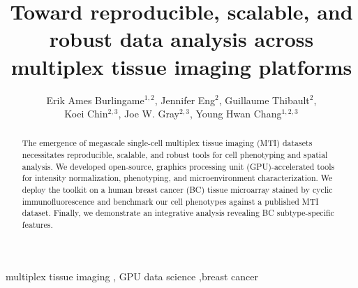 \documentclass[preprint,review,3p,12pt]{elsarticle}
\begin{document}
\begin{frontmatter}


\title{Toward reproducible, scalable, and robust data analysis across multiplex tissue imaging platforms
}




\author{Erik Ames Burlingame$^{1,2}$, Jennifer Eng$^{2}$, Guillaume Thibault$^{2}$, \\ Koei Chin$^{2,3}$, Joe W. Gray$^{2,3}$, Young Hwan Chang$^{1,2,3}$}

\address{$^{1}$Computational Biology Program, Department of Biomedical Engineering, Oregon Health and Science University, Portland, OR, USA}
\address{$^{2}$OHSU Center for Spatial Systems Biomedicine, Department of Biomedical Engineering, Oregon Health and Science University, Portland, OR, USA}
\address{$^{3}$Knight Cancer Institute, Oregon Health and Science University, Portland, OR, USA}
\begin{abstract}
The emergence of megascale single-cell multiplex tissue imaging (MTI) datasets necessitates reproducible, scalable, and robust tools for cell phenotyping and spatial analysis. We developed open-source, 
graphics processing unit (GPU)-accelerated tools for intensity normalization, phenotyping, and microenvironment characterization. We deploy the toolkit on a human breast cancer (BC) tissue microarray stained by cyclic immunofluorescence and benchmark our cell phenotypes against a published MTI dataset. Finally, we demonstrate an integrative analysis revealing BC subtype-specific features.
\end{abstract}

\begin{keyword}
multiplex tissue imaging \sep 
GPU data science \sep breast cancer


\end{keyword}

\end{frontmatter}
\end{document}
